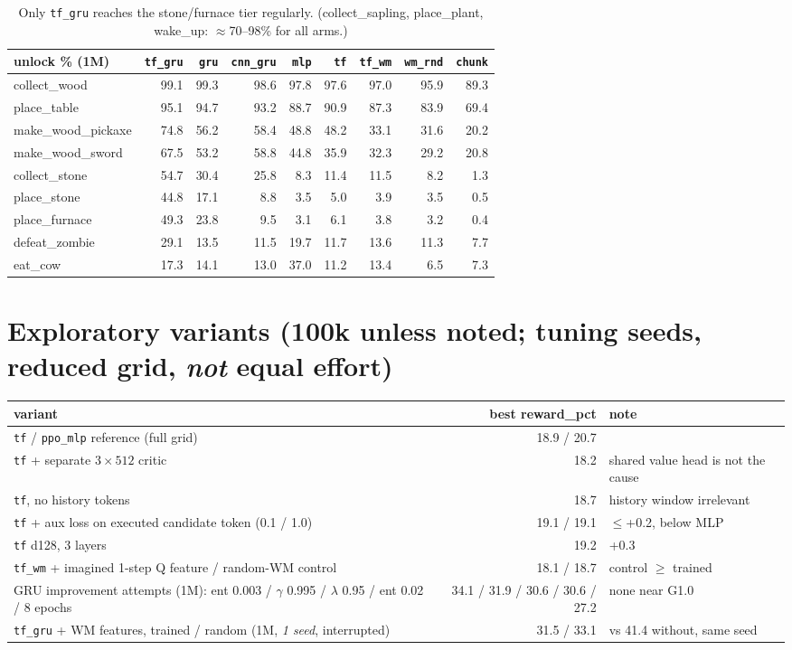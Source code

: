 \documentclass[10pt]{article}
\newcommand{\p}[1]{\texttt{\small #1}}
\begin{document}
\begin{table}[h]\centering\footnotesize
\begin{tabular}{@{}lrrrrrrrr@{}}\toprule
unlock \% (1M) & \p{tf\_gru} & \p{gru} & \p{cnn\_gru} & \p{mlp} & \p{tf} & \p{tf\_wm} & \p{wm\_rnd} & \p{chunk}\\\midrule
collect\_wood & 99.1 & 99.3 & 98.6 & 97.8 & 97.6 & 97.0 & 95.9 & 89.3\\
place\_table & 95.1 & 94.7 & 93.2 & 88.7 & 90.9 & 87.3 & 83.9 & 69.4\\
make\_wood\_pickaxe & 74.8 & 56.2 & 58.4 & 48.8 & 48.2 & 33.1 & 31.6 & 20.2\\
make\_wood\_sword & 67.5 & 53.2 & 58.8 & 44.8 & 35.9 & 32.3 & 29.2 & 20.8\\
collect\_stone & 54.7 & 30.4 & 25.8 & 8.3 & 11.4 & 11.5 & 8.2 & 1.3\\
place\_stone & 44.8 & 17.1 & 8.8 & 3.5 & 5.0 & 3.9 & 3.5 & 0.5\\
place\_furnace & 49.3 & 23.8 & 9.5 & 3.1 & 6.1 & 3.8 & 3.2 & 0.4\\
defeat\_zombie & 29.1 & 13.5 & 11.5 & 19.7 & 11.7 & 13.6 & 11.3 & 7.7\\
eat\_cow & 17.3 & 14.1 & 13.0 & 37.0 & 11.2 & 13.4 & 6.5 & 7.3\\\bottomrule
\end{tabular}
\caption*{Only \p{tf\_gru} reaches the stone/furnace tier regularly. (collect\_sapling, place\_plant, wake\_up: $\approx$70--98\% for all arms.)}
\end{table}

\section*{Exploratory variants (100k unless noted; tuning seeds, reduced grid, \emph{not} equal effort)}
\begin{center}\small
\begin{tabular}{@{}p{7.4cm}rp{4.6cm}@{}}\toprule
variant & best reward\_pct & note\\\midrule
\p{tf} / \p{ppo\_mlp} reference (full grid) & 18.9 / 20.7 & \\
\p{tf} + separate $3{\times}512$ critic & 18.2 & shared value head is not the cause\\
\p{tf}, no history tokens & 18.7 & history window irrelevant\\
\p{tf} + aux loss on executed candidate token (0.1 / 1.0) & 19.1 / 19.1 & $\le$+0.2, below MLP\\
\p{tf} d128, 3 layers & 19.2 & +0.3\\
\p{tf\_wm} + imagined 1-step Q feature / random-WM control & 18.1 / 18.7 & control $\ge$ trained\\
GRU improvement attempts (1M): ent 0.003 / $\gamma$ 0.995 / $\lambda$ 0.95 / ent 0.02 / 8 epochs & 34.1 / 31.9 / 30.6 / 30.6 / 27.2 & none near G1.0\\
\p{tf\_gru} + WM features, trained / random (1M, \emph{1 seed}, interrupted) & 31.5 / 33.1 & vs 41.4 without, same seed\\\bottomrule
\end{tabular}
\end{center}
\end{document}
